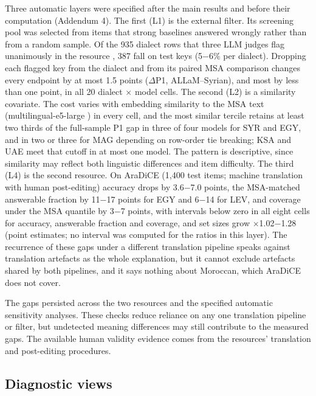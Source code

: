 \documentclass[applsci,article,submit,pdftex,oneauthor]{Definitions/mdpi}
\begin{document}
Three automatic layers were specified after the main results and before their computation (Addendum 4). The first (L1) is the external filter. Its screening pool was selected from items that strong baselines answered wrongly rather than from a random sample. Of the 935 dialect rows that three LLM judges flag unanimously in the resource \cite{ifm2026verified}, 387 fall on test keys (5$-$6\% per dialect). Dropping each flagged key from the dialect and from its paired MSA comparison changes every endpoint by at most 1.5 points ($\Delta$P1, ALLaM--Syrian), and most by less than one point, in all 20 dialect $\times$ model cells. The second (L2) is a similarity covariate. The cost varies with embedding similarity to the MSA text (multilingual-e5-large \cite{wang2024multilinguale5}) in every cell, and the most similar tercile retains at least two thirds of the full-sample P1 gap in three of four models for SYR and EGY, and in two or three for MAG depending on row-order tie breaking; KSA and UAE meet that cutoff in at most one model. The pattern is descriptive, since similarity may reflect both linguistic differences and item difficulty. The third (L4) is the second resource. On AraDiCE (1,400 test items; machine translation with human post-editing) accuracy drops by 3.6$-$7.0 points, the MSA-matched answerable fraction by 11$-$17 points for EGY and 6$-$14 for LEV, and coverage under the MSA quantile by 3$-$7 points, with intervals below zero in all eight cells for accuracy, answerable fraction and coverage, and set sizes grow $\times$1.02$-$1.28 (point estimates; no interval was computed for the ratios in this layer). The recurrence of these gaps under a different translation pipeline speaks against translation artefacts as the whole explanation, but it cannot exclude artefacts shared by both pipelines, and it says nothing about Moroccan, which AraDiCE does not cover.

The gaps persisted across the two resources and the specified automatic sensitivity analyses. These checks reduce reliance on any one translation pipeline or filter, but undetected meaning differences may still contribute to the measured gaps. The available human validity evidence comes from the resources' translation and post-editing procedures.

\hypertarget{diagnostic-views}{%
\subsection{Diagnostic views}\label{diagnostic-views}}
\end{document}
